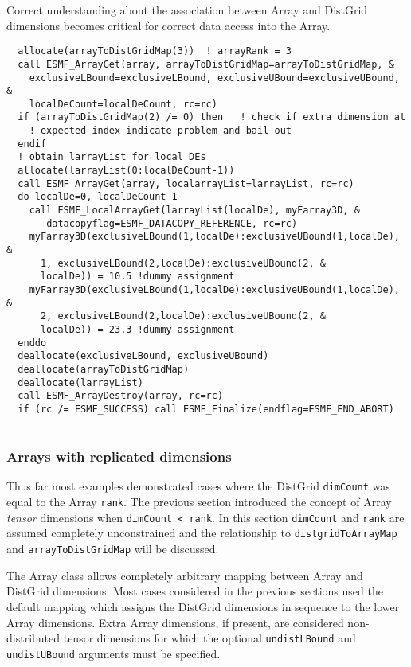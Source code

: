    Correct understanding about the association between Array and DistGrid
   dimensions becomes critical for correct data access into the Array. 

 \begin{verbatim}
  allocate(arrayToDistGridMap(3))  ! arrayRank = 3
  call ESMF_ArrayGet(array, arrayToDistGridMap=arrayToDistGridMap, &
    exclusiveLBound=exclusiveLBound, exclusiveUBound=exclusiveUBound, &
    localDeCount=localDeCount, rc=rc)  
  if (arrayToDistGridMap(2) /= 0) then   ! check if extra dimension at 
    ! expected index indicate problem and bail out
  endif
  ! obtain larrayList for local DEs
  allocate(larrayList(0:localDeCount-1))
  call ESMF_ArrayGet(array, localarrayList=larrayList, rc=rc)
  do localDe=0, localDeCount-1
    call ESMF_LocalArrayGet(larrayList(localDe), myFarray3D, &
       datacopyflag=ESMF_DATACOPY_REFERENCE, rc=rc)
    myFarray3D(exclusiveLBound(1,localDe):exclusiveUBound(1,localDe), &
      1, exclusiveLBound(2,localDe):exclusiveUBound(2, &
      localDe)) = 10.5 !dummy assignment
    myFarray3D(exclusiveLBound(1,localDe):exclusiveUBound(1,localDe), &
      2, exclusiveLBound(2,localDe):exclusiveUBound(2, &
      localDe)) = 23.3 !dummy assignment
  enddo
  deallocate(exclusiveLBound, exclusiveUBound)
  deallocate(arrayToDistGridMap)
  deallocate(larrayList)
  call ESMF_ArrayDestroy(array, rc=rc)
  if (rc /= ESMF_SUCCESS) call ESMF_Finalize(endflag=ESMF_END_ABORT)
 
\end{verbatim}
 

  
   \subsubsection{Arrays with replicated dimensions}
  
   Thus far most examples demonstrated cases where the DistGrid {\tt dimCount}
   was equal to the Array {\tt rank}. The previous section introduced the
   concept of Array {\em tensor} dimensions when {\tt dimCount < rank}. In this
   section {\tt dimCount} and {\tt rank} are assumed completely unconstrained and
   the relationship to {\tt distgridToArrayMap} and {\tt arrayToDistGridMap} will
   be discussed.
  
   The Array class allows completely arbitrary mapping between Array and
   DistGrid dimensions. Most cases considered in the previous sections used
   the default mapping which assigns the DistGrid dimensions in sequence to the
   lower Array dimensions. Extra Array dimensions, if present, are considered
   non-distributed tensor dimensions for which the optional {\tt undistLBound}
   and {\tt undistUBound} arguments must be specified.
  
